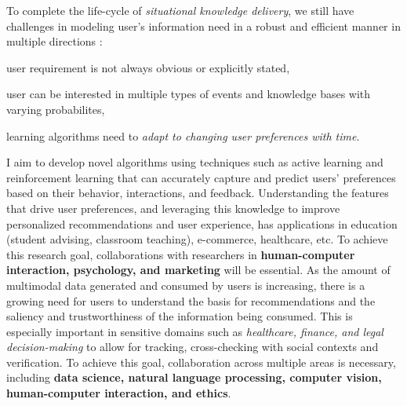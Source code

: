 To complete the life-cycle of \textit{situational knowledge delivery}, we still have challenges in modeling user's information need in a robust and efficient manner in multiple directions \cite{solaiman2021applying}:
\begin{enumerate*}[label=(\arabic*)]
    \item user requirement is not always obvious or explicitly stated,
    \item user can be interested in multiple types of events and knowledge bases with varying probabilites,
    \item learning algorithms need to \textit{adapt to changing user preferences with time}.
\end{enumerate*}
I aim to develop novel algorithms using techniques such as active learning and reinforcement learning that can accurately capture and predict users' preferences based on their behavior, interactions, and feedback.
Understanding the features that drive user preferences, and leveraging this knowledge to improve personalized recommendations and user experience, has applications in education (student advising, classroom teaching), e-commerce, healthcare, etc.
%
%
To achieve this research goal, collaborations with researchers in \textbf{ human-computer interaction, psychology, and marketing} will be essential. 
As the amount of multimodal data generated and consumed by users is increasing, there is a growing need for users to understand the basis for recommendations \cite{solaiman2022femmir}
and the saliency and trustworthiness of the information being consumed. This is especially important in sensitive domains such as \textit{healthcare, finance, and legal decision-making} to allow for tracking, cross-checking with social contexts and verification.
To achieve this goal, collaboration across multiple areas is necessary, including\textbf{ data science, 
natural language processing, computer vision,  human-computer interaction, and ethics}. 

